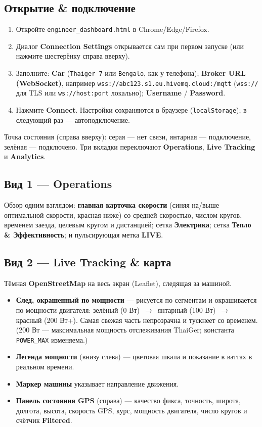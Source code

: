 \documentclass[11pt,a4paper,oneside]{report}
\newcommand{\arrow}{\,$\rightarrow$\,}
\newcommand{\code}[1]{\texttt{#1}}
\begin{document}
\subsection{Открытие \& подключение}
\begin{enumerate}
  \item Откройте \code{engineer\_dashboard.html} в Chrome/Edge/Firefox.
  \item Диалог \textbf{Connection Settings} открывается сам при первом запуске (или
    нажмите шестерёнку справа вверху).
  \item Заполните: \textbf{Car} (\code{Thaiger 7} или \code{Bengalo}, как у
    телефона); \textbf{Broker URL (WebSocket)}, например
    \code{wss://abc123.s1.eu.hivemq.cloud:/mqtt} (\code{wss://} для TLS или
    \code{ws://host:port} локально); \textbf{Username} / \textbf{Password}.
  \item Нажмите \textbf{Connect}. Настройки сохраняются в браузере
    (\code{localStorage}); в следующий раз --- автоподключение.
\end{enumerate}
Точка состояния (справа вверху): серая --- нет связи, янтарная --- подключение,
зелёная --- подключено. Три вкладки переключают \textbf{Operations},
\textbf{Live Tracking} и \textbf{Analytics}.

\subsection{Вид 1 --- Operations}
Обзор одним взглядом: \textbf{главная карточка скорости} (синяя на/выше оптимальной
скорости, красная ниже) со средней скоростью, числом кругов, временем заезда,
целевым кругом и дистанцией; сетка \textbf{Электрика}; сетка \textbf{Тепло \&
Эффективность}; и пульсирующая метка \textbf{LIVE}.

\subsection{Вид 2 --- Live Tracking \& карта}
Тёмная \textbf{OpenStreetMap} на весь экран (Leaflet), следящая за машиной.
\begin{itemize}
  \item \textbf{След, окрашенный по мощности} --- рисуется по сегментам и
    окрашивается по мощности двигателя: \textcolor{tgreen}{зелёный (0 Вт)} \arrow{}
    \textcolor{tamber}{янтарный (100 Вт)} \arrow{} \textcolor{tred}{красный
    (200 Вт+)}. Самая свежая часть непрозрачна и тускнеет со временем. (200 Вт ---
    максимальная мощность отслеживания ThaiGer; константа \code{POWER\_MAX}
    изменяема.)
  \item \textbf{Легенда мощности} (внизу слева) --- цветовая шкала и показание в
    ваттах в реальном времени.
  \item \textbf{Маркер машины} указывает направление движения.
  \item \textbf{Панель состояния GPS} (справа) --- качество фикса, точность, широта,
    долгота, высота, скорость GPS, курс, мощность двигателя, число кругов и счётчик
    \textbf{Filtered}.
\end{itemize}
\end{document}
